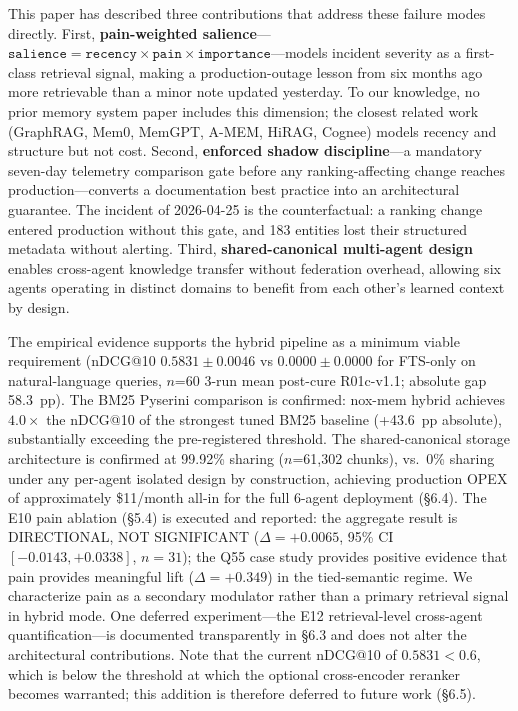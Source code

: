 This paper has described three contributions that address these failure modes directly.
First, \textbf{pain-weighted salience}---$\texttt{salience} = \texttt{recency} \times
\texttt{pain} \times \texttt{importance}$---models incident severity as a first-class
retrieval signal, making a production-outage lesson from six months ago more retrievable
than a minor note updated yesterday. To our knowledge, no prior memory system paper
includes this dimension; the closest related work (GraphRAG, Mem0, MemGPT, A-MEM, HiRAG,
Cognee) models recency and structure but not cost. Second, \textbf{enforced shadow
discipline}---a mandatory seven-day telemetry comparison gate before any ranking-affecting
change reaches production---converts a documentation best practice into an architectural
guarantee. The incident of 2026-04-25 is the counterfactual: a ranking change entered
production without this gate, and 183 entities lost their structured metadata without
alerting. Third, \textbf{shared-canonical multi-agent design} enables cross-agent
knowledge transfer without federation overhead, allowing six agents operating in distinct
domains to benefit from each other's learned context by design.

The empirical evidence supports the hybrid pipeline as a minimum viable requirement
(nDCG@10 $0.5831 \pm 0.0046$ vs $0.0000 \pm 0.0000$ for FTS-only on natural-language
queries, $n$=60 3-run mean post-cure R01c-v1.1; absolute gap 58.3~pp). The BM25 Pyserini comparison is
confirmed: nox-mem hybrid achieves $4.0\times$ the nDCG@10 of the strongest tuned BM25
baseline (+43.6~pp absolute), substantially exceeding the pre-registered threshold. The
shared-canonical storage architecture is confirmed at 99.92\% sharing ($n$=61,302 chunks),
vs.\ 0\% sharing under any per-agent isolated design by construction, achieving production OPEX of approximately
\$11/month all-in for the full 6-agent deployment (\S6.4). The E10 pain ablation (\S5.4)
is executed and reported: the aggregate result is DIRECTIONAL, NOT SIGNIFICANT
($\Delta = +0.0065$, 95\% CI $[-0.0143, +0.0338]$, $n=31$); the Q55 case study provides
positive evidence that pain provides meaningful lift ($\Delta = +0.349$) in the
tied-semantic regime. We characterize pain as a secondary modulator rather than a primary
retrieval signal in hybrid mode. One deferred experiment---the E12 retrieval-level
cross-agent quantification---is documented transparently in \S6.3 and does not alter the
architectural contributions. Note that the current nDCG@10 of $0.5831 < 0.6$, which is below
the threshold at which the optional cross-encoder reranker becomes warranted; this addition
is therefore deferred to future work (\S6.5).

